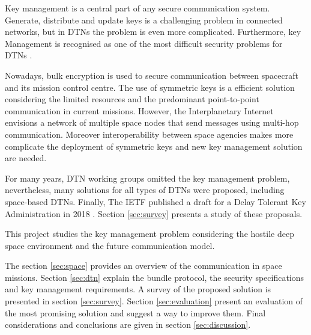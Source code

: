Key management is a central part of any secure communication system. Generate, distribute and update keys is a challenging problem in connected networks, but in DTNs the problem is even more complicated. Furthermore, key Management is recognised as one of the most difficult security problems for DTNs  \cite{menesidou2017cryptographic}.

Nowadays, bulk encryption is used to secure communication between spacecraft and its mission control centre. The use of symmetric keys is a efficient solution considering the limited resources and the predominant point-to-point communication in current missions. However, the Interplanetary Internet envisions a network of multiple space nodes that send messages using multi-hop communication. Moreover interoperability between space agencies makes more complicate the deployment of symmetric keys and new key management solution are needed.


For many years, DTN working groups omitted the key management problem, nevertheless, many solutions for all types of DTNs were proposed, including space-based DTNs. Finally, The IETF published a draft for a Delay Tolerant Key Administration in 2018 \cite{burleigh-dtnwg-dtka-01}. Section \ref{sec:survey} presents a study of these proposals.   


This project studies the key management problem considering the hostile deep space environment and the future communication model. 

The section \ref{sec:space} provides an overview of the communication in space missions. Section \ref{sec:dtn} explain the bundle protocol, the security specifications and key management requirements. A survey of the proposed solution is presented in section \ref{sec:survey}. Section \ref{sec:evaluation} present an evaluation of the most promising solution and suggest a way to improve them. Final considerations and conclusions are given in section \ref{sec:discussion}. 





